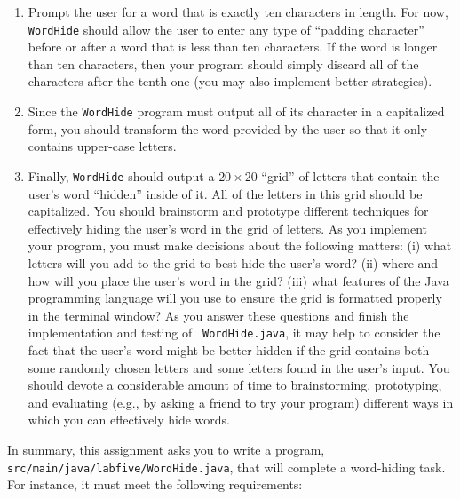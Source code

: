 \documentclass[11pt]{article}
\newcommand{\mainprogramsource}{\lstinline{src/main/java/labfive/WordHide.java}}
\begin{document}
\begin{enumerate}

  \itemsep0in

  \item Prompt the user for a word that is exactly ten characters in length. For
    now, {\tt WordHide} should allow the user to enter any type of ``padding
    character'' before or after a word that is less than ten characters. If the
    word is longer than ten characters, then your program should simply discard
    all of the characters after the tenth one (you may also implement better
    strategies).

  \item Since the {\tt WordHide} program must output all of its character in a
    capitalized form, you should transform the word provided by the user so that
    it only contains upper-case letters.

  \item Finally, {\tt WordHide} should output a $20 \times 20$ ``grid'' of
    letters that contain the user's word ``hidden'' inside of it. All of the
    letters in this grid should be capitalized. You should brainstorm and
    prototype different techniques for effectively hiding the user's word in the
    grid of letters. As you implement your program, you must make decisions
    about the following matters: (i) what letters will you add to the grid to
    best hide the user's word? (ii) where and how will you place the user's word
    in the grid? (iii) what features of the Java programming language will you
    use to ensure the grid is formatted properly in the terminal window? As you
    answer these questions and finish the implementation and testing of {\tt
    WordHide.java}, it may help to consider the fact that the user's word might
    be better hidden if the grid contains both some randomly chosen letters and
    some letters found in the user's input. You should devote a considerable
    amount of time to brainstorming, prototyping, and evaluating (e.g., by
    asking a friend to try your program) different ways in which you can
    effectively hide words.

\end{enumerate}

\vspace*{-.1in}

In summary, this assignment asks you to write a program, \mainprogramsource{},
that will complete a word-hiding task. For instance, it must meet the following
requirements:
\end{document}
